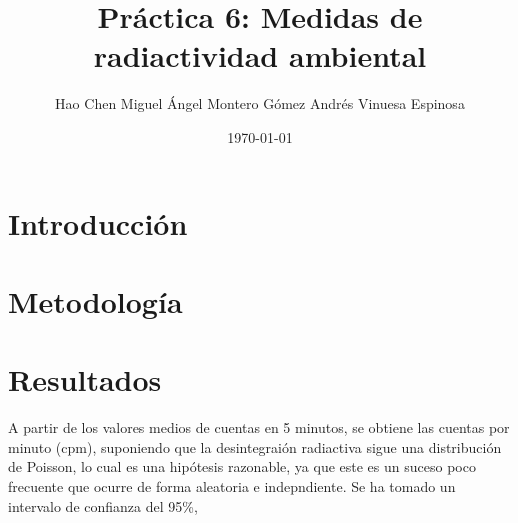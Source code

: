 \documentclass[11pt]{article}
\title{Práctica 6: Medidas de radiactividad ambiental}
\author{Hao Chen Miguel Ángel Montero Gómez Andrés Vinuesa Espinosa}
\date{\today}
\begin{document}
\maketitle

\section{Introducción}
\section{Metodología}
\section{Resultados}
A partir de los valores medios de cuentas en 5 minutos, se obtiene las cuentas por minuto (cpm), suponiendo
que la desintegraión radiactiva sigue una distribución de Poisson, lo cual es una hipótesis razonable, 
ya que este es un suceso poco frecuente que ocurre de forma aleatoria e indepndiente.
Se ha tomado un intervalo de confianza del 95\%,
\end{document}

